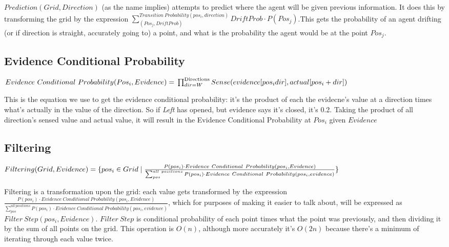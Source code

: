 \documentclass[11pt]{article}
\begin{document}
\(Prediction(Grid, Direction)\) (as the name implies) attempts to predict where the agent will be given previous information. It does this by transforming the grid by the expression  \(\sum^{Transition\ Probability(pos_i, direction)}_{(Pos_j, DriftProb)} DriftProb \cdot P(Pos_j)\).This gets the probability of an agent drifting (or if direction is straight, accurately going to) a point, and what is the probability the agent would be at the point \(Pos_j\).


\subsection*{Evidence Conditional Probability}
\label{sec:orgf51bda8}
   \begin{math}
  Evidence\ Conditional\ Probability(Pos_i, Evidence)= \\
  \prod^{\text{Directions} }_{dir=W} Sense(evidence[pos_i dir], actual[pos_i+dir])
\end{math}

This is the equation we use to get the evidence conditional probability: it's the product of each the evidecne's value at a direction times what's actually in the value of the direction. So if \emph{Left} has opened, but evidence says it's closed, it's 0.2. Taking the product of all direction's sensed value and actual value, it will result in the Evidence Conditional Probability at \(Pos_i\) given \(Evidence\)

\subsection*{Filtering}
\label{sec:orga1fe660}


   \begin{math}
Filtering(Grid, Evidence) = \{pos_i \in Grid \mid\\
\frac{P(pos_i) \cdot Evidence\ Conditional\ Probability(pos_i, Evidence) }{\sum^{all\ positions}_{pos} P(pos_i) \cdot Evidence\ Conditional\ Probability(pos_i, evidence) } \}
\end{math}



Filtering is a transformation upon the grid: each value gets transformed by the expression \(\frac{P(pos_i) \cdot Evidence\ Conditional\ Probability(pos_i, Evidence) }{\sum^{all\ positions}_{pos} P(pos_i) \cdot Evidence\ Conditional\ Probability(pos_i, evidence) }\), which for purposes of making it easier to talk about, will be expressed as \(Filter\ Step(pos_i, Evidence)\). \(Filter\ Step\) is conditional probability of each point times what the point was previously, and then dividing it  by the sum of all points on the grid. This operation is \(O(n)\), although more accurately it's \(O(2n)\) because there's a minimum of iterating through each value twice.
\end{document}

